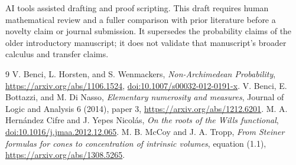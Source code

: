 \documentclass[11pt]{article}
\theoremstyle{definition}
\theoremstyle{remark}
\begin{document}
AI tools assisted drafting and proof scripting. This draft requires human
mathematical review and a fuller comparison with prior literature before
a novelty claim or journal submission. It supersedes the probability
claims of the older introductory manuscript; it does not validate that
manuscript's broader calculus and transfer claims.

\begin{thebibliography}{9}
 V. Benci, L. Horsten, and S. Wenmackers,
\emph{Non-Archimedean Probability},
\url{https://arxiv.org/abs/1106.1524},
\href{https://doi.org/10.1007/s00032-012-0191-x}{doi:10.1007/s00032-012-0191-x}.
 V. Benci, E. Bottazzi, and M. Di Nasso,
\emph{Elementary numerosity and measures}, Journal of Logic and Analysis
6 (2014), paper 3, \url{https://arxiv.org/abs/1212.6201}.
 M. A. Hern\'andez Cifre and J. Yepes Nicol\'as,
\emph{On the roots of the Wills functional},
\href{https://doi.org/10.1016/j.jmaa.2012.12.065}{doi:10.1016/j.jmaa.2012.12.065}.
 M. B. McCoy and J. A. Tropp,
\emph{From Steiner formulas for cones to concentration of intrinsic volumes},
equation (1.1), \url{https://arxiv.org/abs/1308.5265}.
\end{thebibliography}
\end{document}
